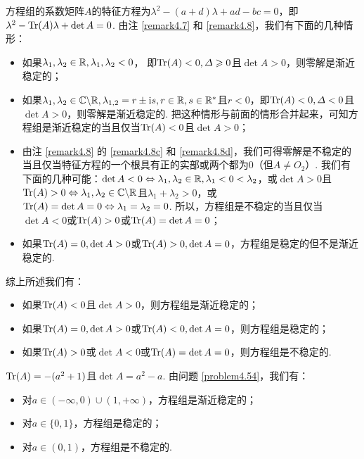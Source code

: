 \begin{solution}
  方程组的系数矩阵$A$的特征方程为$\lambda^2-(a+d)\lambda+ad-bc=0$，即$\lambda^2-\operatorname{Tr}(A)\lambda+\det A=0$. 由注 \ref{remark4.7} 和 \ref{remark4.8}，我们有下面的几种情形：
  \begin{itemize}
    \item 如果$\lambda_1,\lambda_2\in\mathbb R,\lambda_1,\lambda_2<0$，
        即$\operatorname{Tr}(A)<0,\varDelta\geqslant0$且$\det A>0$，则零解是渐近稳定的；
    \item 如果$\lambda_1,\lambda_2\in\mathbb C\backslash\mathbb R,\lambda_{1,2}=r\pm\mathrm i s,r\in\mathbb R,s\in\mathbb R^\ast$且$r<0$，即$\operatorname{Tr}(A)<0,\varDelta<0$且$\det A>0$，则零解是渐近稳定的. 把这种情形与前面的情形合并起来，可知方程组是渐近稳定的当且仅当$\operatorname{Tr}(A)<0$且$\det A>0$；
    \item 由注 \ref{remark4.8} 的 \ref{remark4.8c} 和 \ref{remark4.8d}，我们可得零解是不稳定的当且仅当特征方程的一个根具有正的实部或两个都为0（但$A\ne O_2$）. 我们有下面的几种可能：$\det A<0\Leftrightarrow\lambda_1,\lambda_2\in\mathbb R,
        \lambda_1<0<\lambda_2$，或$\det A>0$且$\operatorname{Tr}(A)>0\Leftrightarrow \lambda_1,\lambda_2\in\mathbb C\backslash\mathbb R$且$\lambda_1
        +\lambda_2>0$，或$\operatorname{Tr}(A)=\det A=0\Leftrightarrow\lambda_1=\lambda_2=0$. 所以，方程组是不稳定的当且仅当$\det A<0$或$\operatorname{Tr}(A)>0$或$\operatorname{Tr}(A)=\det A=0$；
    \item 如果$\operatorname{Tr}(A)=0,\det A>0$或$\operatorname{Tr}(A)>0,\det A=0$，方程组是稳定的但不是渐近稳定的.
  \end{itemize}

  综上所述我们有：
  \begin{itemize}
    \item 如果$\operatorname{Tr}(A)<0$且$\det A>0$，则方程组是渐近稳定的；
    \item 如果$\operatorname{Tr}(A)=0,\det A>0$或$\operatorname{Tr}(A)<0,\det A=0$，则方程组是稳定的；
    \item 如果$\operatorname{Tr}(A)>0$或$\det A<0$或$\operatorname{Tr}(A)=\det A=0$，则方程组是不稳定的.
  \end{itemize}
\end{solution}

\begin{solution}
  $\operatorname{Tr}(A)=-(a^2+1)$且$\det A=a^2-a$. 由问题 \ref{problem4.54}，我们有：
  \begin{itemize}
    \item 对$a\in(-\infty,0)\cup(1,+\infty)$，方程组是渐近稳定的；
    \item 对$a\in\{0,1\}$，方程组是稳定的；
    \item 对$a\in(0,1)$，方程组是不稳定的.
  \end{itemize}
\end{solution}

